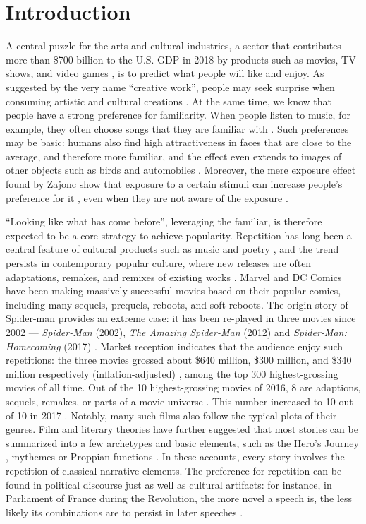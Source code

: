 \documentclass[letterpaper]{article} %
\begin{document}
\section*{Introduction}
\noindent 
A central puzzle for the arts and cultural industries, a sector that contributes more than \$700 billion to the U.S. GDP in 2018 by products such as movies, TV shows, and video games \cite{artsculturalindustries}, is to predict what people will like and enjoy. As suggested by the very name ``creative work'', people may seek surprise when consuming artistic and cultural creations \cite{hutter2011infinite}. At the same time, we know that people have a strong preference for familiarity. When people listen to music, for example, they often choose songs that they are familiar with \cite{thompson2014shazam}. Such preferences may be basic:  humans also find high attractiveness in faces that are close to the average, and therefore more familiar, and the effect even extends to images of other objects such as birds and automobiles \cite{Halberstadt2003}. Moreover, the mere exposure effect found by Zajonc show that exposure to a certain stimuli can increase people's preference for it \cite{zajonc1968attitudinal}, even when they are not aware of the exposure \cite{kunst1980affective,bornstein1989exposure}. 

``Looking like what has come before'', leveraging the familiar, is therefore expected to be a core strategy to achieve popularity. Repetition has long been a central feature of cultural products such as music and poetry \cite{huron2013psychological}, and  the trend persists in contemporary popular culture, where new releases are often adaptations, remakes, and remixes of existing works \cite{manovich2007comes}. Marvel and DC Comics have been making massively successful movies based on their popular comics, including many sequels, prequels, reboots, and soft reboots. The origin story of Spider-man provides an extreme case: it has been re-played in three movies since 2002 --- \emph{Spider-Man} (2002), \emph{The Amazing Spider-Man} (2012) and \emph{Spider-Man: Homecoming} (2017) \cite{spiderman}. Market reception indicates that the audience enjoy such repetitions: the three movies grossed about \$640 million, \$300 million, and \$340 million respectively (inflation-adjusted) \cite{spider-gross}, among the top 300 highest-grossing movies of all time. Out of the 10 highest-grossing movies of 2016, 8 are adaptions, sequels, remakes, or parts of a movie universe \cite{2016film}. This number increased to 10 out of 10 in 2017 \cite{2017film}. Notably, many such films also follow the typical plots of their genres. Film and literary theories have further suggested that most stories can be summarized into a few archetypes and basic elements, such as the Hero's Journey \cite{campbell2008hero}, mythemes \cite{levi1955structural} or Proppian functions \cite{propp2010morphology}. In these accounts, every story involves the repetition of classical narrative elements. The preference for repetition can be found in political discourse just as well as cultural artifacts: for instance, in Parliament of France during the Revolution, the more novel a speech is, the less likely its combinations are to persist in later speeches \cite{barron2018individuals}.
\end{document}
